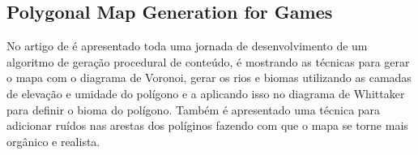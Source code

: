  \subsection*{Polygonal Map Generation for Games}

 No artigo de \space{} é apresentado toda uma jornada de desenvolvimento de um algoritmo de geração procedural de conteúdo, é mostrando as técnicas para gerar o mapa com o diagrama de Voronoi, gerar os rios e biomas utilizando as camadas de elevação e umidade do polígono e a aplicando isso no diagrama de Whittaker para definir o bioma do polígono. Também é apresentado uma técnica para adicionar ruídos nas arestas dos políginos fazendo com que o mapa se torne mais orgânico e realista.